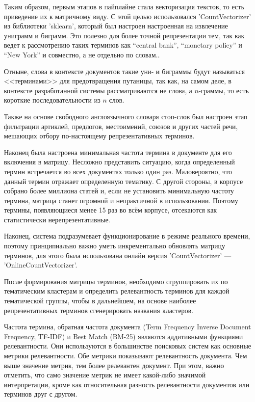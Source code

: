 Таким образом, первым этапов в пайплайне стала векторизация текстов, то есть приведение их к матричному виду.
С этой целью использовался 'CountVectorizer' из библиотеки 'sklearn', который был настроен настроенная
на извлечение униграмм и биграмм. Это полезно для более точной репрезентации тем, так как ведет к рассмотрению
таких терминов как “central bank”, “monetary policy” и “New York” и совместно, а не отдельно по словам..


Отныне, слова в контексте документов такие уни- и биграммы будут называться <<терминами>> для предотвращения
путаницы, так как, на самом деле, в контексте разработанной системы рассматриваются не слова, а $n$-граммы,
то есть короткие последовательности из $n$ слов.

Также на основе свободного англоязычного словаря стоп-слов \parencite{nothman2018stop} был настроен этап
фильтрации артиклей, предлогов, местоимений, союзов и других частей речи, мешающих отбору по-настоящему
репрезентативных терминов.

Наконец была настроена минимальная частота термина в документе для его включения в матрицу.
Несложно представить ситуацию, когда определенный термин встречается во всех документах только
один раз. Маловероятно, что данный термин отражает определенную тематику. С другой стороны,
в корпусе собрано более миллиона статей и, если не установить минимальную частоту термина,
матрица станет огромной и непрактичной в использовании. Поэтому термины, появляющиеся менее
15 раз во всём корпусе, отсекаются как статистически нерепрезентативные.

Наконец, система подразумевает функционирование в режиме реального времени, поэтому принципиально
важно уметь инкрементально обновлять матрицу терминов, для этого была использована онлайн версия
'CountVectorizer' --- 'OnlineCountVectorizer'.

После формирования матрицы терминов, необходимо сгруппировать их по тематическим кластерам
и определить релевантность терминов для каждой тематической группы, чтобы в дальнейшем,
на основе наиболее репрезентативных терминов сгенерировать названия кластеров.

Частота термина, обратная частота документа (Term Frequency Inverse Document Frequency, TF-IDF)
и Best Match (BM-25) являются аддитивными функциями релевантности. Они используются в большинстве
поисковых систем как основные метрики релевантности. Обе метрики показывают релевантность документа.
Чем выше значение метрик, тем более релевантен документ. При этом, важно отметить, что само значение
метрик не имеет какой-либо значимой интерпретации, кроме как относительная разность релевантности
документов или терминов друг с другом.

